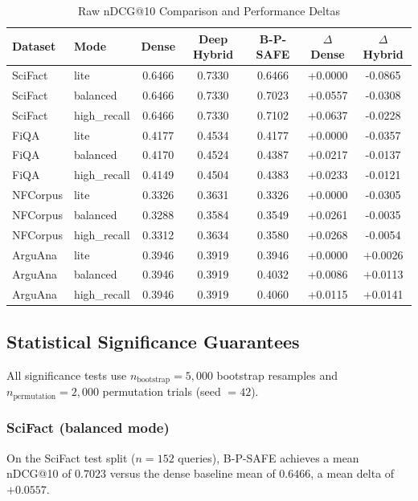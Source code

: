 \documentclass[journal]{IEEEtran}
\begin{document}
\begin{table}[t]
\centering
\caption{Raw nDCG@10 Comparison and Performance Deltas}
\label{tab:raw_metrics}
\begin{tabular}{llccccc}
\toprule
Dataset & Mode & Dense & Deep Hybrid & B-P-SAFE & $\Delta$ Dense & $\Delta$ Hybrid \\
\midrule
SciFact & lite & 0.6466 & 0.7330 & 0.6466 & +0.0000 & -0.0865 \\
SciFact & balanced & 0.6466 & 0.7330 & 0.7023 & +0.0557 & -0.0308 \\
SciFact & high\_recall & 0.6466 & 0.7330 & 0.7102 & +0.0637 & -0.0228 \\
\midrule
FiQA & lite & 0.4177 & 0.4534 & 0.4177 & +0.0000 & -0.0357 \\
FiQA & balanced & 0.4170 & 0.4524 & 0.4387 & +0.0217 & -0.0137 \\
FiQA & high\_recall & 0.4149 & 0.4504 & 0.4383 & +0.0233 & -0.0121 \\
\midrule
NFCorpus & lite & 0.3326 & 0.3631 & 0.3326 & +0.0000 & -0.0305 \\
NFCorpus & balanced & 0.3288 & 0.3584 & 0.3549 & +0.0261 & -0.0035 \\
NFCorpus & high\_recall & 0.3312 & 0.3634 & 0.3580 & +0.0268 & -0.0054 \\
\midrule
ArguAna & lite & 0.3946 & 0.3919 & 0.3946 & +0.0000 & +0.0026 \\
ArguAna & balanced & 0.3946 & 0.3919 & 0.4032 & +0.0086 & +0.0113 \\
ArguAna & high\_recall & 0.3946 & 0.3919 & 0.4060 & +0.0115 & +0.0141 \\
\bottomrule
\end{tabular}
\end{table}


\subsection{Statistical Significance Guarantees}
\label{sec:stats}

All significance tests use
$n_{\text{bootstrap}} = 5{,}000$ bootstrap resamples and
$n_{\text{permutation}} = 2{,}000$ permutation trials
(seed $= 42$).

\subsubsection{SciFact (balanced mode)}
On the SciFact test split ($n = 152$ queries), B-P-SAFE achieves a
mean nDCG@10 of $0.7023$ versus the dense baseline mean of $0.6466$,
a mean delta of $+0.0557$.
\end{document}
